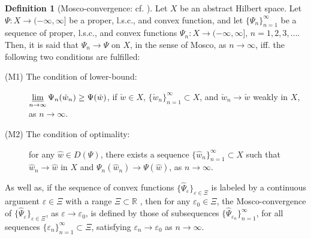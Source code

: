 \documentclass{sinst}
\numberwithin{equation}{section}
\theoremstyle{plain}
\theoremstyle{definition}
\newtheorem{defn}{Definition}%
\def\ds{\displaystyle}
\begin{document}
\begin{defn}[Mosco-convergence: cf. \cite{MR0298508}]\label{Def.Mosco}
    Let $ X $ be an abstract Hilbert space. Let $ \Psi : X \rightarrow (-\infty, \infty] $ be a proper, l.s.c., and convex function, and let $ \{ \Psi_n \}_{n = 1}^\infty $ be a sequence of proper, l.s.c., and convex functions $ \Psi_n : X \rightarrow (-\infty, \infty] $, $ n = 1, 2, 3, \dots $.  Then, it is said that $ \Psi_n \to \Psi $ on $ X $, in the sense of Mosco, as $ n \to \infty $, iff. the following two conditions are fulfilled:
    \begin{description}
      \item[(\hypertarget{M_lb}{M1}) The condition of lower-bound:]$ \ds \varliminf_{n \to \infty} \Psi_n(\check{w}_n) \geq \Psi(\check{w}) $, if $ \check{w} \in X $, $ \{ \check{w}_n  \}_{n = 1}^\infty \subset X $, and $ \check{w}_n \to \check{w} $ weakly in $ X $, as $ n \to \infty $. 
      \item[(\hypertarget{M_opt}{M2}) The condition of optimality:]for any $ \hat{w} \in D(\Psi) $, there exists a sequence \linebreak $ \{ \hat{w}_n \}_{n = 1}^\infty  \subset X $ such that $ \hat{w}_n \to \hat{w} $ in $ X $ and $ \Psi_n(\hat{w}_n) \to \Psi(\hat{w}) $, as $ n \to \infty $.
    \end{description}
    As well as, if the sequence of convex functions $ \{ \widehat{\Psi}_\varepsilon \}_{\varepsilon \in \Xi} $ is labeled by a continuous argument $\varepsilon \in \Xi$ with a range $\Xi \subset \mathbb{R}$ , then for any $\varepsilon_{0} \in \Xi$, the Mosco-convergence of $\{ \widehat{\Psi}_\varepsilon \}_{\varepsilon \in \Xi}$, as $\varepsilon \to \varepsilon_{0}$, is defined by those of subsequences $ \{ \widehat{\Psi}_{\varepsilon_n} \}_{n = 1}^\infty $, for all sequences $\{ \varepsilon_n \}_{n=1}^{\infty} \subset \Xi$, satisfying $\varepsilon_{n} \to \varepsilon_{0}$ as $n \to \infty$.
  \end{defn}
  
\end{document}
